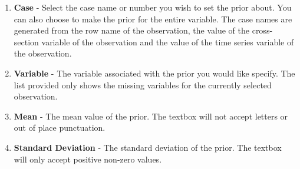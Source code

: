 \documentclass[12pt,titlepage]{article}
\begin{document}
\begin{enumerate}
\item \textbf{Case} - Select the case name or number you wish to set the prior
  about.  You can also choose to make the prior for the entire variable.  The
  case names are generated from the row name of the observation, the value of the
  cross-section variable of the observation and the value of the time series
  variable of the observation.  
\item \textbf{Variable} - The variable associated with the prior you would like
  specify.  The list provided only shows the missing variables for the currently
  selected observation.  
\item \textbf{Mean} - The mean value of the prior. The textbox will not accept
  letters or out of place punctuation.
\item \textbf{Standard Deviation} - The standard deviation of the prior.  The
  textbox will only accept positive non-zero values.  
\end{enumerate}
\end{document}
